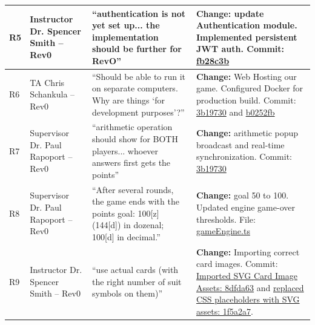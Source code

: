 \documentclass{article}
\begin{document}
\begin{longtable}{p{} p{} p{} p{}}
R5 & Instructor Dr. Spencer Smith -- Rev0 & ``authentication is not yet set up... the implementation should be further for RevO'' & \textbf{Change:} update Authentication module. Implemented persistent JWT auth. \newline Commit: \href{https://github.com/The-Crazy-Four-Games/Crazy_1-0s_Game/commit/fb28c3b87b813e39ed40b9ea22af8be98762e0f1}{fb28c3b} \\
\midrule

R6 & TA Chris Schankula -- Rev0 & ``Should be able to run it on separate computers. Why are things `for development purposes'?'' & \textbf{Change:} Web Hosting our game. Configured Docker for production build. \newline Commit: \href{https://github.com/The-Crazy-Four-Games/Crazy_1-0s_Game/commit/3b197305d8b6b9daf059262d88a4de3a7487f13d}{3b19730} and \href{https://github.com/The-Crazy-Four-Games/Crazy_1-0s_Game/commit/b0252fb731e237fdca47b8d4a9ff0198aafd90ed}{b0252fb} \\
\midrule

R7 & Supervisor Dr. Paul Rapoport -- Rev0 & ``arithmetic operation should show for BOTH players... whoever answers first gets the points'' & \textbf{Change:} arithmetic popup broadcast and real-time synchronization. \newline Commit: \href{https://github.com/The-Crazy-Four-Games/Crazy_1-0s_Game/commit/3b197305d8b6b9daf059262d88a4de3a7487f13d}{3b19730} \\
\midrule

R8 & Supervisor Dr. Paul Rapoport -- Rev0 & ``After several rounds, the game ends with the points goal: 100[z] (144[d]) in dozenal; 100[d] in decimal.'' & \textbf{Change:} goal 50 to 100. Updated engine game-over thresholds. \newline File: \href{https://github.com/The-Crazy-Four-Games/Crazy_1-0s_Game/commits/main/src/rev0/shared/src/gameEngine.ts}{gameEngine.ts} \\
\midrule

R9 & Instructor Dr. Spencer Smith -- Rev0 & ``use actual cards (with the right number of suit symbols on them)'' & \textbf{Change:} Importing correct card images. \newline Commit: \href{https://github.com/The-Crazy-Four-Games/Crazy_1-0s_Game/commit/8dfda63374346d05ed91c2656dac31f992fcbaed}{Imported SVG Card Image Assets: 8dfda63} and \href{https://github.com/The-Crazy-Four-Games/Crazy_1-0s_Game/commit/1f5a2a7708a07520b940434f43ccac0bbd2146b6}{replaced CSS placeholders with SVG assets: 1f5a2a7}. \\
\midrule


\end{longtable}
\end{document}
